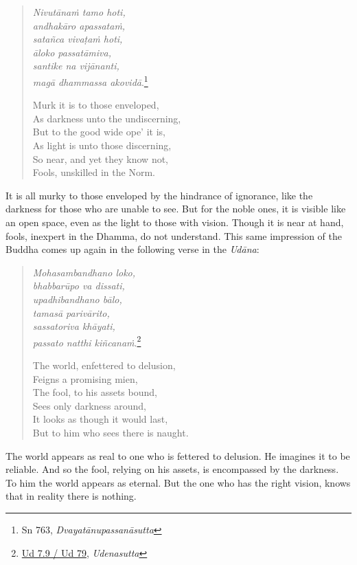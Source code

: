 \begin{quote}
\emph{Nivutānaṁ tamo hoti,}\\
\emph{andhakāro apassataṁ,}\\
\emph{satañca vivaṭaṁ hoti,}\\
\emph{āloko passatāmiva,}\\
\emph{santike na vijānanti,}\\
\emph{magā dhammassa akovidā}.\footnote{Sn 763, \emph{Dvayatānupassanāsutta}}

Murk it is to those enveloped,\\
As darkness unto the undiscerning,\\
But to the good wide ope' it is,\\
As light is unto those discerning,\\
So near, and yet they know not,\\
Fools, unskilled in the Norm.
\end{quote}

It is all murky to those enveloped by the hindrance of ignorance, like the darkness for those who are unable to see. But for the noble ones, it is visible like an open space, even as the light to those with vision. Though it is near at hand, fools, inexpert in the Dhamma, do not understand. This same impression of the Buddha comes up again in the following verse in the \emph{Udāna}:

\begin{quote}
\emph{Mohasambandhano loko,}\\
\emph{bhabbarūpo va dissati,}\\
\emph{upadhibandhano bālo,}\\
\emph{tamasā parivārito,}\\
\emph{sassatoriva khāyati,}\\
\emph{passato natthi kiñcanaṁ}.\footnote{\href{https://suttacentral.net/ud7.9/pli/ms}{Ud 7.9 / Ud 79}, \emph{Udenasutta}}

The world, enfettered to delusion,\\
Feigns a promising mien,\\
The fool, to his assets bound,\\
Sees only darkness around,\\
It looks as though it would last,\\
But to him who sees there is naught.
\end{quote}

The world appears as real to one who is fettered to delusion. He imagines it to be reliable. And so the fool, relying on his assets, is encompassed by the darkness. To him the world appears as eternal. But the one who has the right vision, knows that in reality there is nothing.

